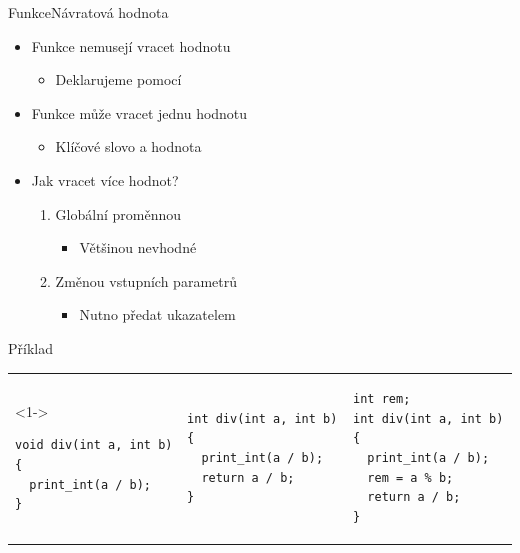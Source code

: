\begin{frame}[fragile]{Funkce}{Návratová hodnota}

  \begin{itemize}
    \item Funkce nemusejí vracet hodnotu
    \begin{itemize}
      \item Deklarujeme pomocí 
    \end{itemize}

    \pause

    \item Funkce může vracet jednu hodnotu
    \begin{itemize}
      \item Klíčové slovo  a hodnota
    \end{itemize}

    \pause

    \item Jak vracet více hodnot?
    \begin{enumerate}
      \item Globální proměnnou
      \begin{itemize}
	\item Většinou nevhodné
      \end{itemize}

      \pause

      \item Změnou vstupních parametrů
      \begin{itemize}
	\item Nutno předat ukazatelem
      \end{itemize}
    \end{enumerate}

  \end{itemize}

\begin{block}{Příklad}
\begin{center}
\begin{tabular}{l|l|l}
\begin{onslide}<1->
\begin{lstlisting}
void div(int a, int b) {
  print_int(a / b);
}
\end{lstlisting}
\end{onslide}
&
\begin{lstlisting}
int div(int a, int b) {
  print_int(a / b);
  return a / b;
}
\end{lstlisting}
&
\begin{lstlisting}
int rem;
int div(int a, int b) {
  print_int(a / b);
  rem = a % b;
  return a / b;
}
\end{lstlisting}
\end{tabular}
\end{center}
\end{block}

\end{frame}

